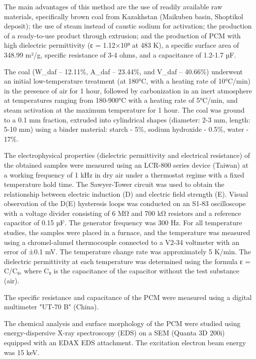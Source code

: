 The main advantages of this method are the use of readily available raw
materials, specifically brown coal from Kazakhstan (Maikuben basin,
Shoptikol deposit); the use of steam instead of caustic sodium for
activation; the production of a ready-to-use product through extrusion;
and the production of PCM with high dielectric permittivity (ε =
1.12×10⁹ at 483 K), a specific surface area of 348.99 m²/g, specific
resistance of 3-4 ohms, and a capacitance of 1.2-1.7 µF.

The coal (W\_daf -- 12.11\%, A\_daf -- 23.44\%, and V\_daf -- 40.66\%)
underwent an initial low-temperature treatment (at 180°C, with a heating
rate of 10°C/min) in the presence of air for 1 hour, followed by
carbonization in an inert atmosphere at temperatures ranging from
180-900°C with a heating rate of 5°C/min, and steam activation at the
maximum temperature for 1 hour. The coal was ground to a 0.1 mm
fraction, extruded into cylindrical shapes (diameter: 2-3 mm, length:
5-10 mm) using a binder material: starch - 5\%, sodium hydroxide -
0.5\%, water - 17\%.

The electrophysical properties (dielectric permittivity and electrical
resistance) of the obtained samples were measured using an LCR-800
series device (Taiwan) at a working frequency of 1 kHz in dry air under
a thermostat regime with a fixed temperature hold time. The Sawyer-Tower
circuit was used to obtain the relationship between electric induction
(D) and electric field strength (E). Visual observation of the D(E)
hysteresis loops was conducted on an S1-83 oscilloscope with a voltage
divider consisting of 6 MΩ and 700 kΩ resistors and a reference
capacitor of 0.15 µF. The generator frequency was 300 Hz. For all
temperature studies, the samples were placed in a furnace, and the
temperature was measured using a chromel-alumel thermocouple connected
to a V2-34 voltmeter with an error of ±0.1 mV. The temperature change
rate was approximately 5 K/min. The dielectric permittivity at each
temperature was determined using the formula ε = C/C₀, where C₀ is the
capacitance of the capacitor without the test substance (air).

The specific resistance and capacitance of the PCM were measured using a
digital multimeter "UT-70 B" (China).

The chemical analysis and surface morphology of the PCM were studied
using energy-dispersive X-ray spectroscopy (EDS) on a SEM (Quanta 3D
200i) equipped with an EDAX EDS attachment. The excitation electron beam
energy was 15 keV.


